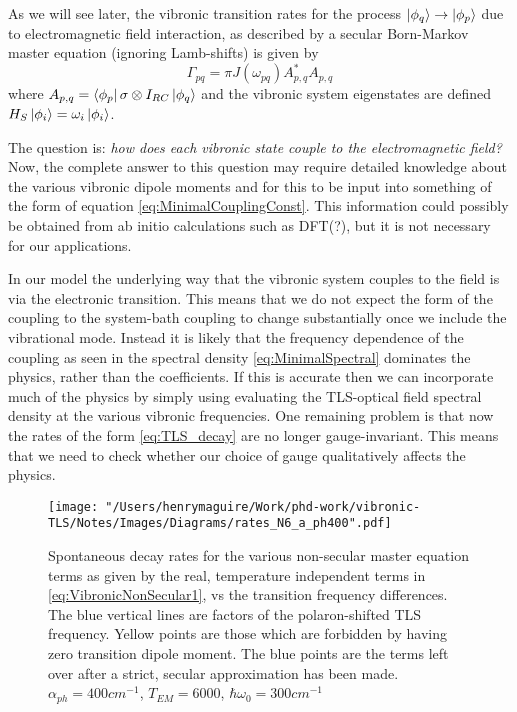 \documentclass[]{article}
\begin{document}
As we will see later, the vibronic transition rates for the process $\ket{\phi_q}\to\ket{\phi_p}$ due to electromagnetic field interaction, as described by a secular Born-Markov master equation (ignoring Lamb-shifts) is given by
\begin{equation}
\Gamma_{pq} = \pi J(\omega_{pq}) A_{p,q}^{*}A_{p,q}
\end{equation}
where $A_{p,q}=\bra{\phi_p}\sigma\otimes I_{RC}\ket{\phi_q}$ and the vibronic system eigenstates are defined $H_S\ket{\phi_i}= \omega_i\ket{\phi_i}$.

The question is: \textit{how does each vibronic state couple to the electromagnetic field?} Now, the complete answer to this question may require detailed knowledge about the various vibronic dipole moments and for this to be input into something of the form of equation \ref{eq:MinimalCouplingConst}. This information could possibly be obtained from ab initio calculations such as DFT(?), but it is not necessary for our applications.

In our model the underlying way that the vibronic system couples to the field is via the electronic transition. This means that we do not expect the form of the coupling to the system-bath coupling to change substantially once we include the vibrational mode. Instead it is likely that the frequency dependence of the coupling as seen in the spectral density \ref{eq:MinimalSpectral} dominates the physics, rather than the coefficients. If this is accurate then we can incorporate much of the physics by simply using evaluating the TLS-optical field spectral density at the various vibronic frequencies. One remaining problem is that now the rates of the form \ref{eq:TLS_decay} are no longer gauge-invariant. This means that we need to check whether our choice of gauge qualitatively affects the physics.

\begin{figure}[t]
	\centering
	\texttt{[image: "/Users/henrymaguire/Work/phd-work/vibronic-TLS/Notes/Images/Diagrams/rates\_N6\_a\_ph400".pdf]}
	\caption{Spontaneous decay rates for the various non-secular master equation terms as given by the real, temperature independent terms in \ref{eq:VibronicNonSecular1}, vs the transition frequency differences. The blue vertical lines are factors of the polaron-shifted TLS frequency. Yellow points are those which are forbidden by having zero transition dipole moment. The blue points are the terms left over after a strict, secular approximation has been made. $\alpha_{ph}=400 cm^{-1}$, $T_{EM} =6000$, $\hbar\omega_0 = 300cm^{-1}$}
	\label{fig:DecayRates_FrequencyDiffs}
\end{figure}
\end{document}

